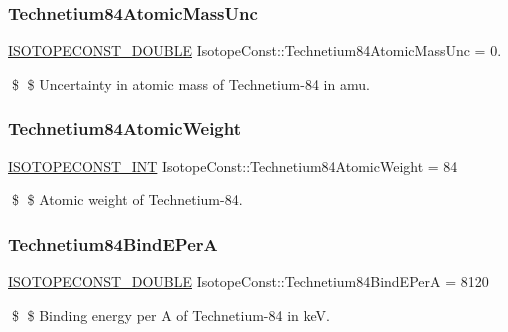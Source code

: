 \subsubsection{\texorpdfstring{Technetium84\+Atomic\+Mass\+Unc}{Technetium84AtomicMassUnc}}
{\footnotesize\ttfamily \mbox{\hyperlink{group___isotope_const-_macros_ga8f45a7272ce02c0b4c65c44636ed719a}{I\+S\+O\+T\+O\+P\+E\+C\+O\+N\+S\+T\+\_\+\+D\+O\+U\+B\+LE}} Isotope\+Const\+::\+Technetium84\+Atomic\+Mass\+Unc = 0.}

\$ \$ Uncertainty in atomic mass of Technetium-\/84 in amu. \mbox{\label{group___isotope_const-_technetium-_tc84_ga8607f9e3d6626f07a102288afa1c1a3f}} 
\subsubsection{\texorpdfstring{Technetium84\+Atomic\+Weight}{Technetium84AtomicWeight}}
{\footnotesize\ttfamily \mbox{\hyperlink{group___isotope_const-_macros_ga5f18360b3e99483a35c32d789e62621c}{I\+S\+O\+T\+O\+P\+E\+C\+O\+N\+S\+T\+\_\+\+I\+NT}} Isotope\+Const\+::\+Technetium84\+Atomic\+Weight = 84}

\$ \$ Atomic weight of Technetium-\/84. \mbox{\label{group___isotope_const-_technetium-_tc84_ga438009eb91959b45c7e4b626ff66bf9b}} 
\subsubsection{\texorpdfstring{Technetium84\+Bind\+E\+PerA}{Technetium84BindEPerA}}
{\footnotesize\ttfamily \mbox{\hyperlink{group___isotope_const-_macros_ga8f45a7272ce02c0b4c65c44636ed719a}{I\+S\+O\+T\+O\+P\+E\+C\+O\+N\+S\+T\+\_\+\+D\+O\+U\+B\+LE}} Isotope\+Const\+::\+Technetium84\+Bind\+E\+PerA = 8120}

\$ \$ Binding energy per A of Technetium-\/84 in keV. \mbox{\label{group___isotope_const-_technetium-_tc84_gacdb432c5d93e8905fea8d334788959cf}} 
